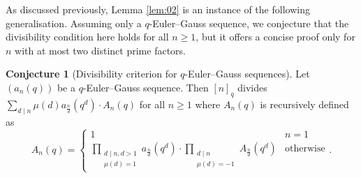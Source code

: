 \documentclass{article}
\numberwithin{equation}{section}
\theoremstyle{definition}
\newtheorem{conjecture}[definition]{\bf {Conjecture}}
\begin{document}
As discussed previously, Lemma \ref{lem:02} is an instance of the following generalisation. Assuming only a $q$-Euler--Gauss sequence, we conjecture that the divisibility condition here holds for all $n\geq1$, but it offers a concise proof only for $n$ with at most two distinct prime factors.
\begin{conjecture}[Divisibility criterion for $q$-Euler--Gauss sequences]\label{conj:1} 
Let $(a_n(q))$ be a $q$-Euler--Gauss sequence. Then $[n]_q$ divides $\sum_{d\mid n} \mu(d)a_{\frac{n}{d}}(q^d)\cdot A_n(q)$ for all $n\geq1$ where $A_n(q)$ is recursively defined as
\[A_n(q)=\begin{cases}
        1&n =1
        \\\prod_{\substack{d\mid n, d>1\\\mu(d)=1}}a_\frac{n}{d}(q^d)\cdot \prod_{\substack{d\mid n\\\mu(d)=-1}}A_\frac{n}{d}(q^d)&\text{otherwise}
    \end{cases}.\]
\end{conjecture}
\end{document}
